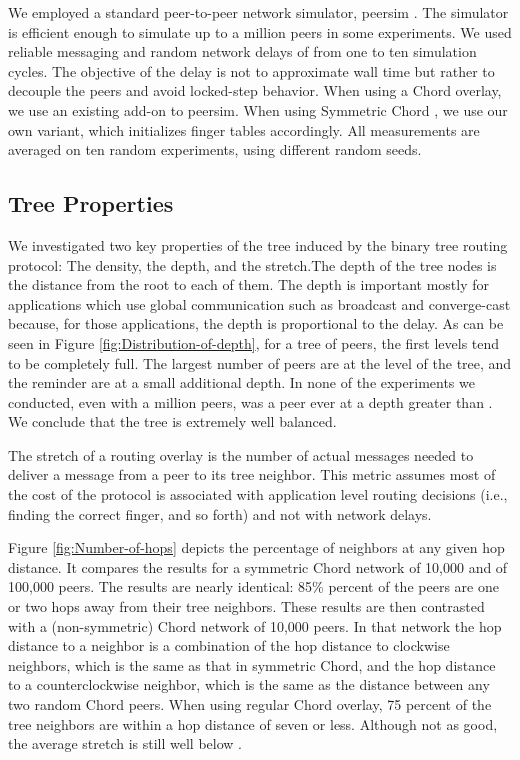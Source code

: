 \documentclass[12pt,english,journal]{elsarticle}
\numberwithin{equation}{section}
\numberwithin{figure}{section}
\theoremstyle{plain}
\theoremstyle{plain}
\begin{document}
We employed a standard peer-to-peer network simulator, peersim \citep{peersim}.
The simulator is efficient enough to simulate up to a million peers
in some experiments. We used reliable messaging and random network
delays of from one to ten simulation cycles. The objective of the
delay is not to approximate wall time but rather to decouple the peers
and avoid locked-step behavior. When using a Chord overlay, we use
an existing add-on to peersim. When using Symmetric Chord \citep{SChord},
we use our own variant, which initializes finger tables accordingly.
All measurements are averaged on ten random experiments, using different
random seeds. 


\subsection{Tree Properties}

We investigated two key properties of the tree induced by the binary
tree routing protocol: The density, the depth, and the stretch.The
depth of the tree nodes is the distance from the root to each of them.
The depth is important mostly for applications which use global communication
such as broadcast and converge-cast because, for those applications,
the depth is proportional to the delay. As can be seen in Figure \ref{fig:Distribution-of-depth},
for a tree of  peers, the first  levels tend to be
completely full. The largest number of peers are at the 
level of the tree, and the reminder are at a small additional depth.
In none of the experiments we conducted, even with a million peers,
was a peer ever at a depth greater than . We
conclude that the tree is extremely well balanced.

The stretch of a routing overlay is the number of actual messages
needed to deliver a message from a peer to its tree neighbor. This
metric assumes most of the cost of the protocol is associated with
application level routing decisions (i.e., finding the correct finger,
and so forth) and not with network delays. 

Figure \ref{fig:Number-of-hops} depicts the percentage of neighbors
at any given hop distance. It compares the results for a symmetric
Chord network of 10,000 and of 100,000 peers. The results are nearly
identical: 85\% percent of the peers are one or two hops away from
their tree neighbors. These results are then contrasted with a (non-symmetric)
Chord network of 10,000 peers. In that network the hop distance to
a neighbor is a combination of the hop distance to clockwise neighbors,
which is the same as that in symmetric Chord, and the hop distance
to a counterclockwise neighbor, which is the same as the distance
between any two random Chord peers. When using regular Chord overlay,
75 percent of the tree neighbors are within a hop distance of seven
or less. Although not as good, the average stretch is still well below
. 
\end{document}
